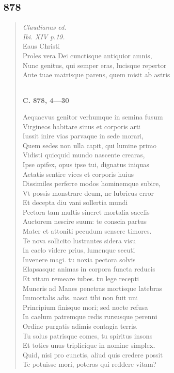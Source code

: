 \documentclass[11pt, a4paper]{report}
\begin{document}
            \subsection*{878}
      \begin{verse}
      \textit{Claudianus ed.} \\ \textit{Ibi. XIV p.19.} \\ Eaus Christi \\ Proles vera Dei cunctisque antiquior amnis, \\ Nunc genitus, qui semper eras, lucisque repertor \\ Ante tuae matrisque parens, quem misit ab astris \\ 
        ﻿\pagebreak 
     \marginpar{[328]} \begin{center} \textbf{C. 878, 4—30} \end{center}Aequaevus genitor verhumque in semina fusum \\ Virgineos habitare sinus et corporis arti \\ Iussit inire vias parvaque in sede morari, \\ Quem sedes non ulla capit, qui lumine primo \\ Vidisti quicquid mundo nascente crearas, \\ Ipse opifex, opus ipse tui, dignatus iniquas \\ Aetatis sentire vices et corporis huius \\ Dissimiles perferre modos hominemque subire, \\ Vt possis monstrare deum, ne lubricus error \\ Et decepta diu vani sollertia mundi \\ Pectora tam multis sineret mortalia saeclis \\ Auctorem nescire suum: te conscia partus \\ Mater et attoniti pecudum sensere timores. \\ Te nova sollicito lustrantes sidera visu \\ In caelo videre prius, lumenque secuti \\ Invenere magi. tu noxia pectora solvis \\ Elapsasque animas in corpora functa reducis \\ Et vitam remeare iubes. tu lege recepti \\ Muneris ad Manes penetras mortisque latebras \\ Immortalis adis. nasci tibi non fuit uni \\ Principium finisque mori; sed nocte refusa \\ In caelum patremque redis rursusque perenni \\ Ordine purgatis adimis contagia terris. \\ Tu solus patrisque comes, tu spiritus insons \\ Et toties unus triplicique in nomine simplex. \\ Quid, nisi pro cunctis, aliud quis credere possit \\ Te potuisse mori, poteras qui reddere vitam? \\ 

\end{verse}
\end{document}
